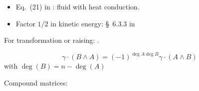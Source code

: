 \documentclass[\ifafour a4paper,12pt,\else a5paper,10pt,\fi%
onecolumn,oneside,article,%
british%
]{memoir}
\theoremstyle{remark}
\theoremstyle{innote}
\renewcommand*{\finalnamedelim}{\addspace\amp\space}
\newcommand*{\amp}{\&}
\renewcommand*{\bm}[1]{\textpdfrender{TextRenderingMode=2,LineWidth=0.1pt}{\boldsymbol{#1}}}
\renewcommand*{\|}[1][]{\nonscript\:#1\vert\nonscript\:\mathopen{}}
\newcommand*{\sect}{\S}%
\newcommand*{\eqn}{eq.}%
\begin{document}
\begin{itemize}
\item Eq.~(21) in \cites{maugin1974b}: fluid with heat conduction.
\item Factor $1/2$ in kinetic energy: \sect~6.3.3 in \cites{gourgoulhon2007_r2012}
\end{itemize}

For transformation or raising:  \cites[\sect~I.4 \eqn~(33)]{gantmacher1959_r2000}.

\begin{equation}
  \gamma\cdot (B\land A) = (-1)^{\deg{A}\deg{B}} \gamma\cdot(A \land B)
\end{equation}
with $\deg(B) = n-\deg(A)$
\cites[prop.~4.1]{barnabeietal1985}


Compound matrices:  \cites[\sect~IV.A.1 p.~199, Problem~1 p.~270]{choquetbruhatetal1977_r1996}

 
\renewcommand*{\finalnamedelim}{\addcomma\space}

\printbibliography[prenote=prenote%
]
\end{document}
